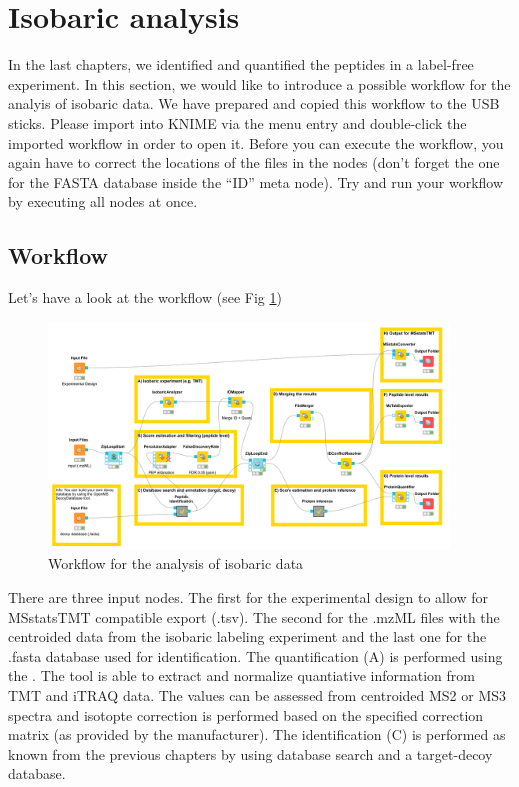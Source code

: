 
\newpage
\section{Isobaric analysis}
In the last chapters, we identified and quantified the peptides in a label-free experiment. In this section, we would like to introduce a possible workflow for the analyis of isobaric data. We have prepared and copied this workflow to the USB sticks. Please import  into KNIME via the menu entry  and double-click the imported workflow in order to open it. Before you can execute the workflow, you again have to correct the locations of the files in the  nodes (don't forget the one for the FASTA database inside the ``ID'' meta node). Try and run your workflow by 
executing all nodes at once.

\subsection{Workflow}
Let's have a look at the workflow (see Fig \ref{fig:isobaric_wf})

\begin{figure}[htbp]
  \centering
  \includegraphics[width=0.95\textwidth]{graphics/isobaric/id_qu_pi_isobaric.png}
  \caption{Workflow for the analysis of isobaric data}
  \label{fig:isobaric_wf}
\end{figure}

There are three input nodes. The first for the experimental design to allow for MSstatsTMT compatible export (.tsv). The second for the .mzML files with the centroided data from the isobaric labeling experiment and the last one for the .fasta database used for identification. The quantification (A) is performed using the . The tool is able to extract and normalize quantiative information from TMT and iTRAQ data. The values can be assessed from centroided MS2 or MS3 spectra and isotopte correction is performed based on the specified correction matrix (as provided by the manufacturer). The identification (C) is performed as known from the previous chapters by using database search and a target-decoy database. 

